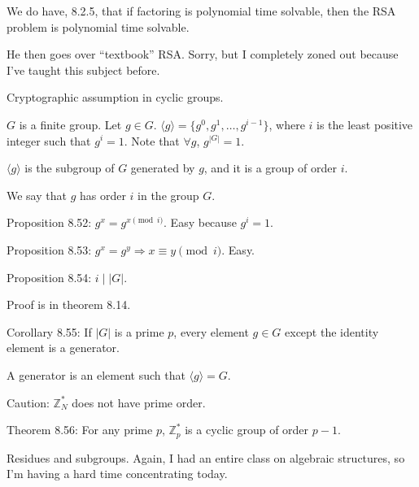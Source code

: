 \documentclass[12pt]{article}
\newcommand{\Z}{\mathbb{Z}}
\newcommand{\ang}[1]{\langle#1\rangle}
\begin{document}
We do have, 8.2.5, that if factoring is polynomial time solvable, then the RSA problem is polynomial time solvable.

He then goes over ``textbook'' RSA. Sorry, but I completely zoned out because I've taught this subject before.

Cryptographic assumption in cyclic groups.

$G$ is a finite group. Let $g\in G$. $\ang{g}=\{g^0,g^1,\dots,g^{i-1}\}$, where $i$ is the least positive integer such that $g^i=1$. Note that $\forall g$, $g^{|G|}=1$.

$\ang{g}$ is the subgroup of $G$ generated by $g$, and it is a group of order $i$.

We say that $g$ has order $i$ in the group $G$.

Proposition 8.52: $g^x=g^{x\pmod{i}}$. Easy because $g^i=1$.

Proposition 8.53: $g^x=g^y\Rightarrow x\equiv y\pmod{i}$. Easy.

Proposition 8.54: $i\mid|G|$.

Proof is in theorem 8.14.

Corollary 8.55: If $|G|$ is a prime $p$, every element $g\in G$ except the identity element is a generator.

A generator is an element such that $\ang{g}=G$.

Caution: $\Z_N^*$ does not have prime order.

Theorem 8.56: For any prime $p$, $\Z_p^*$ is a cyclic group of order $p-1$.

Residues and subgroups. Again, I had an entire class on algebraic structures, so I'm having a hard time concentrating today.
\end{document}
